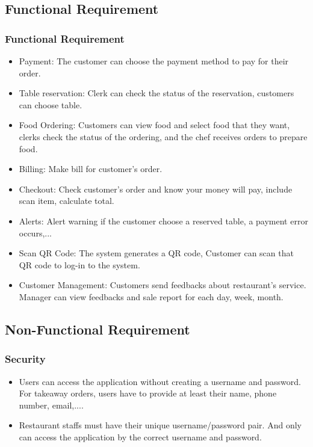 \documentclass[11pt]{article}
\begin{document}
    \subsection{Functional Requirement}
        \subsubsection*{Functional Requirement}
        \begin{itemize}
            \item Payment: The customer can choose the payment method to pay for their order.
            \item Table reservation: Clerk can check the status of the reservation, customers can choose table.
            \item Food Ordering: Customers can view food and select food that they want, clerks check the status of the ordering, and the chef receives orders to prepare food.
            \item Billing: Make bill for customer's order.
            \item Checkout: Check customer's order and know your money will pay, include scan item, calculate total.
            \item Alerts: Alert warning if the customer choose a reserved table, a payment error occurs,...
            \item Scan QR Code: The system generates a QR code, Customer can scan that QR code to log-in to the system.
            \item Customer Management: Customers send feedbacks about restaurant’s service. Manager can view feedbacks and sale report for each day, week, month.
        \end{itemize}
        \subsection{Non-Functional Requirement}
        \subsubsection*{Security}
        \begin{itemize}
            \item Users can access the application without creating a username and password. For takeaway orders, users have to provide at least their name, phone number, email,.... 
            \item Restaurant staffs must have their unique username/password pair. And only can access the application by the correct username and password.
        \end{itemize}
\end{document}
